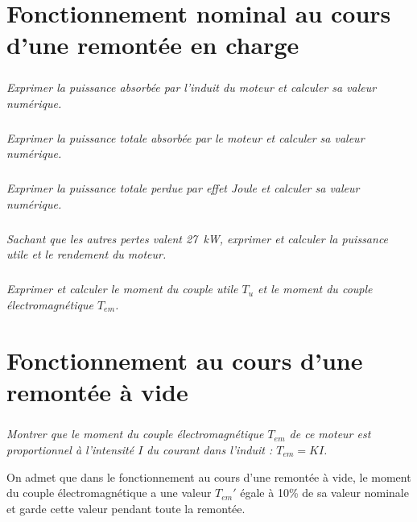 \documentclass[10pt,fleqn]{article} %
\begin{document}
\begin{multicols}{2}
\begin{multicols}{2}
\section*{ Fonctionnement nominal au cours d'une remontée en charge}

\subparagraph{}\textit{Exprimer la puissance absorbée par l'induit du moteur et calculer sa valeur numérique.}
\ifprof
\begin{corrige}
\end{corrige}
\else
\fi

\subparagraph{}\textit{Exprimer la puissance totale absorbée par le moteur et calculer sa valeur numérique. }
\ifprof
\begin{corrige}
\end{corrige}
\else
\fi

\subparagraph{}\textit{Exprimer la puissance totale perdue par effet Joule et calculer sa valeur numérique. }
\ifprof
\begin{corrige}
\end{corrige}
\else
\fi

\subparagraph{}\textit{Sachant que les autres pertes valent \SI{27}{kW}, exprimer et calculer la puissance utile et le
rendement du moteur.}
\ifprof
\begin{corrige}
\end{corrige}
\else
\fi

\subparagraph{}\textit{Exprimer et calculer le moment du couple utile $T_u$ et le moment du couple
électromagnétique $T_{em}$.}
\ifprof
\begin{corrige}
\end{corrige}
\else
\fi



\section*{ Fonctionnement au cours d'une remontée à vide}


\subparagraph{}\textit{ Montrer que le moment du couple électromagnétique $T_{em}$ de ce moteur est proportionnel
à l'intensité $I$ du courant dans l'induit : $T_{em} = KI$. }
\ifprof
\begin{corrige}
\end{corrige}
\else
\fi


On admet que dans le fonctionnement au cours d'une remontée à vide, le moment du couple
électromagnétique a une valeur $T_{em}'$ égale à 10\% de sa valeur nominale et garde cette valeur
pendant toute la remontée. 


\end{multicols}
\end{multicols}
\end{document}
